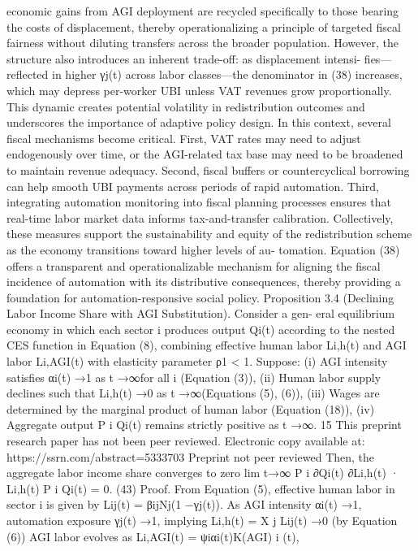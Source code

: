 economic gains from AGI deployment are recycled specifically to those bearing the costs of
displacement, thereby operationalizing a principle of targeted fiscal fairness without diluting
transfers across the broader population.
However, the structure also introduces an inherent trade-off: as displacement intensi-
fies—reflected in higher γj(t) across labor classes—the denominator in (38) increases, which
may depress per-worker UBI unless VAT revenues grow proportionally. This dynamic creates
potential volatility in redistribution outcomes and underscores the importance of adaptive
policy design.
In this context, several fiscal mechanisms become critical. First, VAT rates may need
to adjust endogenously over time, or the AGI-related tax base may need to be broadened
to maintain revenue adequacy. Second, fiscal buffers or countercyclical borrowing can help
smooth UBI payments across periods of rapid automation. Third, integrating automation
monitoring into fiscal planning processes ensures that real-time labor market data informs
tax-and-transfer calibration.
Collectively, these measures support the sustainability and
equity of the redistribution scheme as the economy transitions toward higher levels of au-
tomation.
Equation (38) offers a transparent and operationalizable mechanism for aligning the fiscal
incidence of automation with its distributive consequences, thereby providing a foundation
for automation-responsive social policy.
Proposition 3.4 (Declining Labor Income Share with AGI Substitution). Consider a gen-
eral equilibrium economy in which each sector i produces output Qi(t) according to the
nested CES function in Equation (8), combining effective human labor Li,h(t) and AGI labor
Li,AGI(t) with elasticity parameter ρ1 < 1. Suppose:
(i) AGI intensity satisfies αi(t) →1 as t →∞for all i (Equation (3)),
(ii) Human labor supply declines such that Li,h(t) →0 as t →∞(Equations (5), (6)),
(iii) Wages are determined by the marginal product of human labor (Equation (18)),
(iv) Aggregate output P
i Qi(t) remains strictly positive as t →∞.
15
This preprint research paper has not been peer reviewed. Electronic copy available at: https://ssrn.com/abstract=5333703
Preprint not peer reviewed
Then, the aggregate labor income share converges to zero
lim
t→∞
P
i
∂Qi(t)
∂Li,h(t) · Li,h(t)
P
i Qi(t)
= 0.
(43)
Proof. From Equation (5), effective human labor in sector i is given by
Lij(t) = βijNj(1 −γj(t)).
As AGI intensity αi(t) →1, automation exposure γj(t) →1, implying
Li,h(t) =
X
j
Lij(t) →0
(by Equation (6))
AGI labor evolves as
Li,AGI(t) = ψiαi(t)K(AGI)
i
(t),
